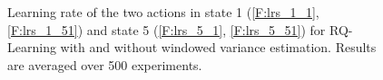 \documentclass[conference]{IEEEtran}
\begin{document}
\begin{figure}[t]
\begin{minipage}{\textwidth}
\centering
\end{minipage}
\caption{Learning rate of the two actions in state 1 (\ref{F:lrs_1_1}, \ref{F:lrs_1_51}) and state 5 (\ref{F:lrs_5_1}, \ref{F:lrs_5_51}) for RQ-Learning with and without windowed variance estimation. Results are averaged over 500 experiments.}
  \label{F:double_chain_lr}
\end{figure}
\end{document}
